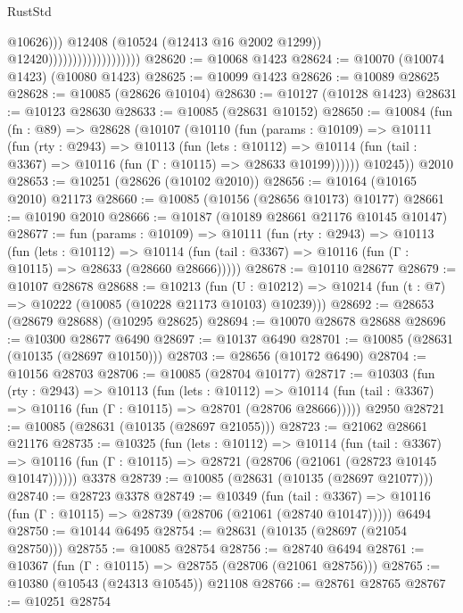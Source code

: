 \begin{lexlean}{RustStd}
\begin{coremodule}
                                                @10626)))
                                          @12408
                                          (@10524 (@12413 @16 @2002 @1299))
                                          @12420)))))))))))))))))))
@28620 := @10068 @1423
@28624 := @10070 (@10074 @1423) (@10080 @1423)
@28625 := @10099 @1423
@28626 := @10089 @28625
@28628 := @10085 (@28626 @10104)
@28630 := @10127 (@10128 @1423)
@28631 := @10123 @28630
@28633 := @10085 (@28631 @10152)
@28650 := @10084
    (fun (fn : @89) =>
    @28628
      (@10107
        (@10110
          (fun (params : @10109) =>
          @10111
            (fun (rty : @2943) =>
            @10113
              (fun (lets : @10112) =>
              @10114 (fun (tail : @3367) => @10116 (fun (Γ : @10115) => @28633 @10199))))))
        @10245))
    @2010
@28653 := @10251 (@28626 (@10102 @2010))
@28656 := @10164 (@10165 @2010) @21173
@28660 := @10085 (@10156 (@28656 @10173) @10177)
@28661 := @10190 @2010
@28666 := @10187 (@10189 @28661 @21176 @10145 @10147)
@28677 := fun (params : @10109) =>
  @10111
    (fun (rty : @2943) =>
    @10113
      (fun (lets : @10112) =>
      @10114 (fun (tail : @3367) => @10116 (fun (Γ : @10115) => @28633 (@28660 @28666)))))
@28678 := @10110 @28677
@28679 := @10107 @28678
@28688 := @10213
    (fun (U : @10212) => @10214 (fun (t : @7) => @10222 (@10085 (@10228 @21173 @10103) @10239)))
@28692 := @28653 (@28679 @28688) (@10295 @28625)
@28694 := @10070 @28678 @28688
@28696 := @10300 @28677 @6490
@28697 := @10137 @6490
@28701 := @10085 (@28631 (@10135 (@28697 @10150)))
@28703 := @28656 (@10172 @6490)
@28704 := @10156 @28703
@28706 := @10085 (@28704 @10177)
@28717 := @10303
    (fun (rty : @2943) =>
    @10113
      (fun (lets : @10112) =>
      @10114 (fun (tail : @3367) => @10116 (fun (Γ : @10115) => @28701 (@28706 @28666)))))
    @2950
@28721 := @10085 (@28631 (@10135 (@28697 @21055)))
@28723 := @21062 @28661 @21176
@28735 := @10325
    (fun (lets : @10112) =>
    @10114
      (fun (tail : @3367) =>
      @10116 (fun (Γ : @10115) => @28721 (@28706 (@21061 (@28723 @10145 @10147))))))
    @3378
@28739 := @10085 (@28631 (@10135 (@28697 @21077)))
@28740 := @28723 @3378
@28749 := @10349
    (fun (tail : @3367) => @10116 (fun (Γ : @10115) => @28739 (@28706 (@21061 (@28740 @10147)))))
    @6494
@28750 := @10144 @6495
@28754 := @28631 (@10135 (@28697 (@21054 @28750)))
@28755 := @10085 @28754
@28756 := @28740 @6494
@28761 := @10367 (fun (Γ : @10115) => @28755 (@28706 (@21061 @28756)))
@28765 := @10380 (@10543 (@24313 @10545)) @21108
@28766 := @28761 @28765
@28767 := @10251 @28754

\end{coremodule}
\end{lexlean}
